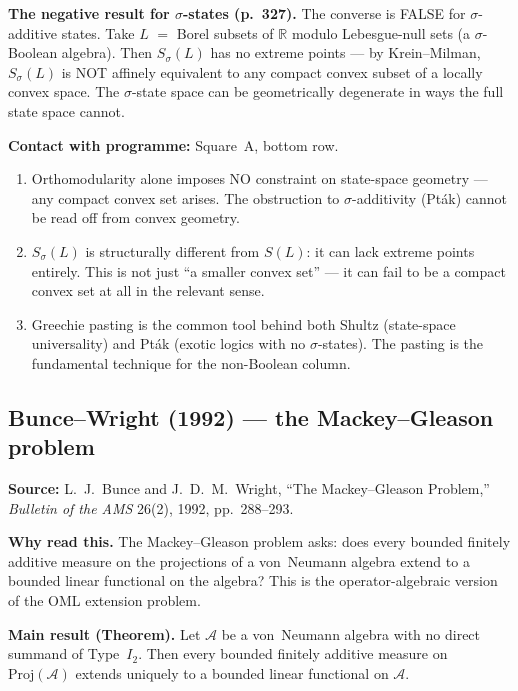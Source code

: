 \medskip\noindent
\textbf{The negative result for $\sigma$-states (p.~327).}  The
converse is FALSE for $\sigma$-additive states.  Take $L$ $=$
Borel subsets of $\mathbb{R}$ modulo Lebesgue-null sets (a
$\sigma$-Boolean algebra).  Then $S_\sigma(L)$ has no extreme
points --- by Krein--Milman, $S_\sigma(L)$ is NOT affinely
equivalent to any compact convex subset of a locally convex space.
The $\sigma$-state space can be geometrically degenerate in ways
the full state space cannot.

\medskip\noindent
\textbf{Contact with programme:} Square~A, bottom row.
\begin{enumerate}[nosep]
  \item Orthomodularity alone imposes NO constraint on state-space
    geometry --- any compact convex set arises.  The obstruction to
    $\sigma$-additivity (Pt\'{a}k) cannot be read off from convex
    geometry.
  \item $S_\sigma(L)$ is structurally different from $S(L)$: it can
    lack extreme points entirely.  This is not just ``a smaller
    convex set'' --- it can fail to be a compact convex set at all
    in the relevant sense.
  \item Greechie pasting is the common tool behind both Shultz
    (state-space universality) and Pt\'{a}k (exotic logics with no
    $\sigma$-states).  The pasting is the fundamental technique for
    the non-Boolean column.
\end{enumerate}

\subsection*{Bunce--Wright (1992) --- the Mackey--Gleason problem}

\textbf{Source:} L.~J.\ Bunce and J.~D.~M.\ Wright, ``The
Mackey--Gleason Problem,'' \emph{Bulletin of the AMS} 26(2), 1992,
pp.~288--293.

\textbf{Why read this.}  The Mackey--Gleason problem asks: does every
bounded finitely additive measure on the projections of a von~Neumann
algebra extend to a bounded linear functional on the algebra?  This is
the operator-algebraic version of the OML extension problem.

\textbf{Main result (Theorem).}  Let $\mathcal{A}$ be a von~Neumann
algebra with no direct summand of Type~$I_2$.  Then every bounded
finitely additive measure on $\text{Proj}(\mathcal{A})$ extends
uniquely to a bounded linear functional on $\mathcal{A}$.

